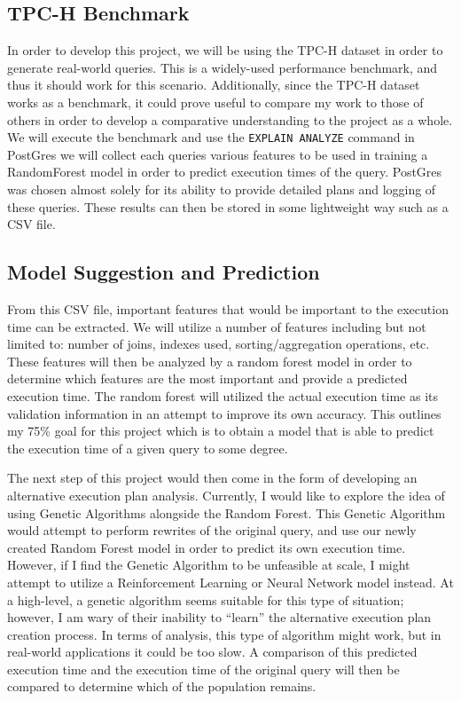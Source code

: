 \documentclass[sigconf]{acmart}
\begin{document}
\subsection{TPC-H Benchmark}
In order to develop this project, we will be using the TPC-H dataset in order to generate real-world queries. This is a widely-used performance
benchmark, and thus it should work for this scenario. Additionally, since the TPC-H dataset works as a benchmark, it could prove useful to compare my
work to those of others in order to develop a comparative understanding to the project as a whole. We will execute the benchmark and 
use the \texttt{EXPLAIN ANALYZE} command in PostGres we will collect each queries various features to be used in training a RandomForest model
in order to predict execution times of the query. PostGres was chosen almost solely for its ability to provide detailed plans and logging of these queries.
These results can then be stored in some lightweight way such as a CSV file.

\subsection{Model Suggestion and Prediction}
From this CSV file, important features that would be important to the execution time can be extracted. We will utilize a number of features including but not limited to:
number of joins, indexes used, sorting/aggregation operations, etc. These features will then be analyzed by a random forest model
in order to determine which features are the most important and provide a predicted execution time. The random forest will utilized the actual
execution time as its validation information in an attempt to improve its own accuracy. This outlines my 75\% goal for this project which is to
obtain a model that is able to predict the execution time of a given query to some degree.

The next step of this project would then come in the form of developing an alternative execution plan analysis. Currently, I would like to explore the
idea of using Genetic Algorithms alongside the Random Forest. This Genetic Algorithm would attempt to perform rewrites of the original query, and
use our newly created Random Forest model in order to predict its own execution time. However, if I find the Genetic Algorithm to be unfeasible at scale,
I might attempt to utilize a Reinforcement Learning or Neural Network model instead. At a high-level, a genetic algorithm seems suitable for this type of situation; however,
I am wary of their inability to ``learn'' the alternative execution plan creation process. In terms of analysis, this type of algorithm might work, but in real-world applications
it could be too slow. A comparison of this predicted execution time and the execution time of the original query will then be compared to determine which of the population remains.
\end{document}
